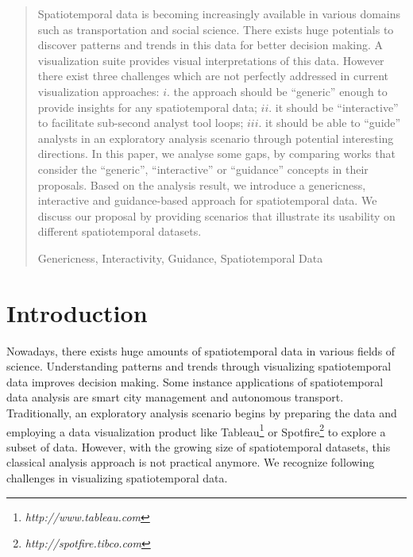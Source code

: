 \documentclass[runningheads,a4paper]{llncs}
\newcommand{\keywords}[1]{\par\addvspace\baselineskip
\noindent\keywordname\enspace\ignorespaces#1}
\begin{document}
\begin{abstract}
Spatiotemporal data is becoming increasingly available in various domains such as transportation and social science. There exists huge potentials to discover patterns and trends in this data for better decision making. A visualization suite provides visual interpretations of this data. However there exist three challenges which are not perfectly addressed in current visualization approaches: $i.$  the approach should be ``generic'' enough to provide insights for any spatiotemporal data; $ii.$ it should be ``interactive'' to facilitate sub-second analyst tool loops; $iii.$ it should be able to ``guide'' analysts in an exploratory analysis scenario through potential interesting directions. In this paper, we analyse some gaps, by comparing works that  consider  the ``generic'', ``interactive'' or ``guidance'' concepts in their proposals. Based on the analysis result,  we introduce a genericness, interactive and guidance-based approach for spatiotemporal data. We discuss our proposal by 
providing  scenarios that illustrate its usability on different spatiotemporal datasets.
\keywords{Genericness, Interactivity,  Guidance, Spatiotemporal Data}
\end{abstract}


\section{Introduction}
Nowadays, there exists huge amounts of spatiotemporal data in various fields of science. Understanding patterns and trends through visualizing spatiotemporal data improves decision making. Some instance applications of spatiotemporal data analysis are smart city management and autonomous transport. Traditionally, an exploratory analysis scenario begins by preparing the data and employing a data visualization product like Tableau\footnote{\it http://www.tableau.com} or Spotfire\footnote{\it http://spotfire.tibco.com} to explore a subset of data. However, with the growing size of spatiotemporal datasets, this classical analysis approach is not practical anymore. We recognize following challenges in visualizing spatiotemporal data.

\end{document}
